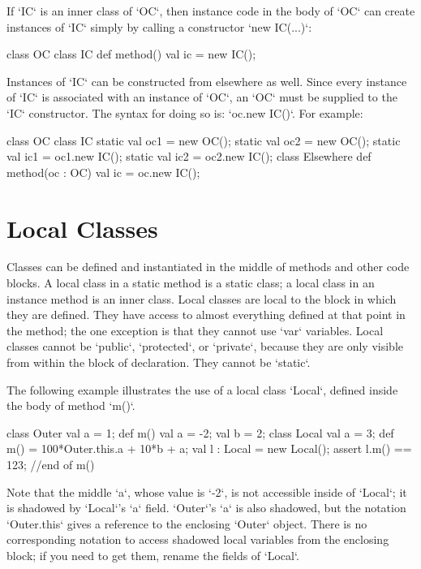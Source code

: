 If \xcd`IC` is an inner class of \xcd`OC`, then instance code in the body of
\xcd`OC` can create instances of \xcd`IC` simply by calling a constructor
\xcd`new IC(...)`: 
\begin{xten}
class OC {
  class IC {}
  def method(){
    val ic = new IC();
  }
}
\end{xten}
%

Instances of \xcd`IC` can be constructed from elsewhere as well.  Since every
instance of \xcd`IC` is associated with an instance of \xcd`OC`, an \xcd`OC`
must be supplied to the \xcd`IC` constructor.  The syntax for doing so is: 
\xcd`oc.new IC()`.  For example: 
\begin{xten}
class OC {
  class IC {}
  static val oc1 = new OC();
  static val oc2 = new OC();
  static val ic1 = oc1.new IC();
  static val ic2 = oc2.new IC();
}
class Elsewhere{
  def method(oc : OC) {
    val ic = oc.new IC();
  }
}
\end{xten}
%


\section{Local Classes}
\label{sect:LocalClasses}

Classes can be defined and instantiated in the middle of methods and other
code blocks.
A local class in a static method is a static class; a local class in an
instance method is an inner class.
 Local classes are local to the block in which they are defined.
They have access to almost everything defined at that point in the method; the
one exception is that they cannot use \xcd`var` variables. Local classes
cannot be \xcd`public`, \xcd`protected`, or \xcd`private`, because they are
only visible from within the block of declaration. They cannot be
\xcd`static`.

\begin{ex}
The following example illustrates the use of a local class \xcd`Local`, 
defined inside the body of method \xcd`m()`. 
\begin{xten}
class Outer {
  val a = 1;
  def m() {
    val a = -2; 
    val b = 2;
    class Local {
      val a = 3;
      def m() = 100*Outer.this.a + 10*b + a; 
    }
    val l : Local = new Local();
    assert l.m() == 123;
  }//end of m()
}
\end{xten}
Note that the middle \xcd`a`,
whose value is \xcd`-2`, is not accessible inside of \xcd`Local`; it is
shadowed by \xcd`Local`'s \xcd`a` field.  \xcd`Outer`'s \xcd`a` is also
shadowed, but the notation \xcd`Outer.this` gives a reference to the enclosing
\xcd`Outer` object.  There is no corresponding notation to access shadowed local
variables from the enclosing block; if you need to get them, rename the fields
of \xcd`Local`.    
\end{ex}


